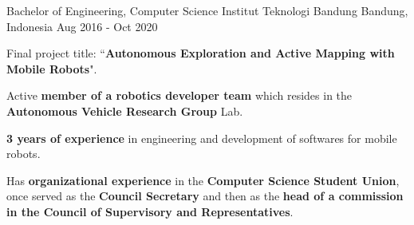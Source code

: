 

\begin{cventries}

  \cventry
    {Bachelor of Engineering, Computer Science} %
    {Institut Teknologi Bandung} %
    {Bandung, Indonesia} %
    {Aug 2016 - Oct 2020} %
    {
   	  \begin{cvitems}
		  \item {Final project title: ``\textbf{Autonomous Exploration and Active Mapping with Mobile Robots}".}
		  \item {Active \textbf{member of a robotics developer team} which resides in the \textbf{Autonomous Vehicle Research Group} Lab.}
		  \item {\textbf{3 years of experience} in engineering and development of softwares for mobile robots.}
          \item {Has \textbf{organizational experience} in the \textbf{Computer Science Student Union}, once served as the \textbf{Council Secretary} and then as the \textbf{head of a commission in the Council of Supervisory and Representatives}.}
   	  \end{cvitems}
    }

\end{cventries}
